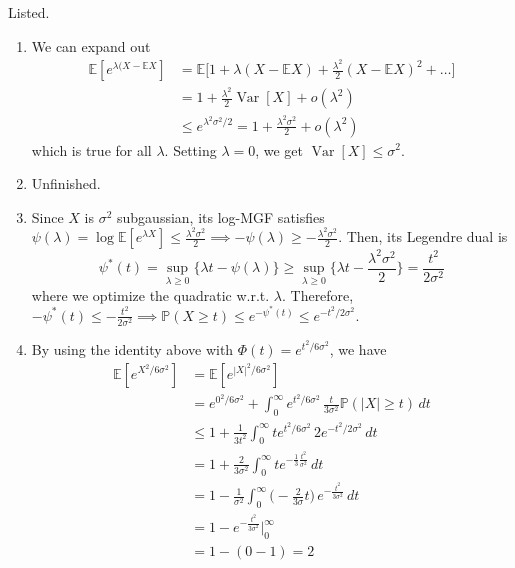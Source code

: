 \documentclass{article}
\DeclareMathOperator{\Var}{Var}
\theoremstyle{definition}
\theoremstyle{remark}
\theoremstyle{definition}
\begin{document}
  \begin{solution}
  Listed. 
  \begin{enumerate}
      \item We can expand out 
      \begin{align*}
          \mathbb{E}[e^{\lambda (X - \mathbb{E} X}] & = \mathbb{E} \bigg[ 1 + \lambda( X - \mathbb{E}X) + \frac{\lambda^2}{2} (X - \mathbb{E} X)^2 + \ldots \bigg] \\
          & = 1 + \frac{\lambda^2}{2} \Var[X] + o(\lambda^2) \\
          & \leq e^{\lambda^2 \sigma^2 / 2} = 1 + \frac{\lambda^2 \sigma^2}{2} + o (\lambda^2)
      \end{align*}
      which is true for all $\lambda$. Setting $\lambda = 0$, we get $\Var[X] \leq \sigma^2$. 
      
      \item Unfinished. 
      
      \item Since $X$ is $\sigma^2$ subgaussian, its log-MGF satisfies $\psi(\lambda) = \log \mathbb{E}[e^{\lambda X}] \leq \frac{\lambda^2 \sigma^2}{2} \implies - \psi(\lambda) \geq - \frac{\lambda^2 \sigma^2}{2}$. Then, its Legendre dual is 
      \[\psi^\ast (t) = \sup_{\lambda \geq 0} \{ \lambda t - \psi(\lambda)\} \geq \sup_{\lambda \geq 0} \{ \lambda t - \frac{\lambda^2 \sigma^2}{2} \} = \frac{t^2}{2 \sigma^2}\]
      where we optimize the quadratic w.r.t. $\lambda$. Therefore, $-\psi^* (t) \leq - \frac{t^2}{2\sigma^2} \implies \mathbb{P}(X \geq t) \leq e^{ - \psi^* (t)} \leq e^{- t^2/ 2 \sigma^2}$. 
      
      
      \item By using the identity above with $\Phi(t) = e^{t^2 / 6 \sigma^2}$, we have 
      \begin{align*}
          \mathbb{E}[e^{X^2 / 6 \sigma^2}] & = \mathbb{E}[e^{|X|^2 / 6 \sigma^2}] \\
          & = e^{0^2 / 6 \sigma^2} + \int_0^\infty e^{t^2 / 6 \sigma^2} \, \frac{t}{3 \sigma^2} \mathbb{P}(|X| \geq t) \, dt \\
          & \leq 1 + \frac{1}{3t^2} \int_0^\infty t e^{t^2 / 6 \sigma^2} \, 2 e^{-t^2 / 2\sigma^2} \, dt\\
          & = 1 + \frac{2}{3 \sigma^2} \int_0^\infty t e^{-\frac{1}{3} \frac{t^2}{\sigma^2}} \, dt \\
          & = 1 - \frac{1}{\sigma^2} \int_0^\infty \Big( - \frac{2}{3 \sigma} t \Big) \, e^{- \frac{t^2}{3 \sigma^2}} \, dt \\
          & = 1 - e^{- \frac{t^2}{3 \sigma^2}} \bigg|_0^\infty \\
          & = 1 - (0 - 1) = 2 
      \end{align*}
      

\end{enumerate}
\end{solution}
\end{document}

